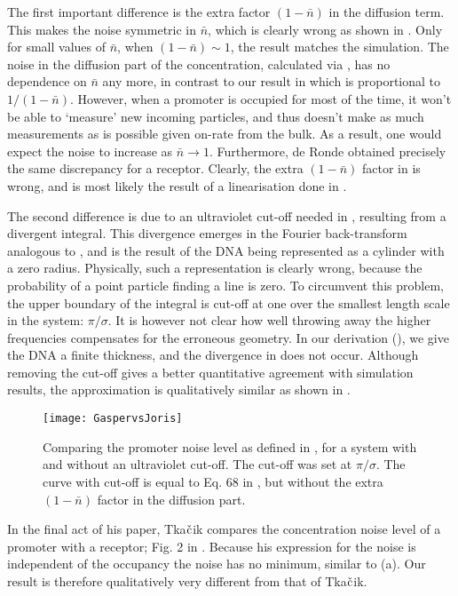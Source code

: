 The first important difference is the extra factor $(1-\bar{n})$ in the diffusion term. This makes the noise symmetric in $\bar{n}$, which is clearly wrong as shown in . Only for small values of $\bar{n}$, when $(1-\bar{n})\sim 1$, the result matches the simulation. The noise in the diffusion part of the concentration, calculated via , has no dependence on $\bar{n}$ any more, in contrast to our result in  which is proportional to $1/(1-\bar{n})$. However, when a promoter is occupied for most of the time, it won't be able to `measure' new incoming particles, and thus doesn't make as much measurements as is possible given on-rate from the bulk. As a result, one would expect the noise to increase as $\bar{n}\to1$. Furthermore, de Ronde \cite{DeRonde2012} obtained precisely the same discrepancy for a receptor. Clearly, the extra $(1-\bar{n})$ factor in  is wrong, and is most likely the result of a linearisation done in \cite{Tkacik2009}. 

The second difference is due to an ultraviolet cut-off needed in \cite{Tkacik2009}, resulting from a divergent integral. This divergence emerges in the Fourier back-transform analogous to , and is the result of the DNA being represented as a cylinder with a zero radius. Physically, such a representation is clearly wrong, because the probability of a point particle finding a line is zero. To circumvent this problem, the upper boundary of the integral is cut-off at one over the smallest length scale in the system: $\pi/\sigma$. It is however not clear how well throwing away the higher frequencies compensates for the erroneous geometry. In our derivation (), we give the DNA a finite thickness, and the divergence in  does not occur. Although removing the cut-off gives a better quantitative agreement with simulation results, the approximation is qualitatively similar as shown in .
\begin{figure}
\centering
\texttt{[image: GaspervsJoris]}
\caption{ Comparing the promoter noise level as defined in , for a system with and without an ultraviolet cut-off. The cut-off was set at $\pi/\sigma$. The curve with cut-off is equal to Eq. 68 in \cite{Tkacik2009}, but without the extra $(1-\bar{n})$ factor in the diffusion part.}
\end{figure}

In the final act of his paper, Tka$\check{\rm c}$ik compares the concentration noise level of a promoter with a receptor; Fig. 2 in \cite{Tkacik2009}. Because his expression for the noise is independent of the occupancy the noise has no minimum, similar to  (a). Our result is therefore qualitatively very different from that of Tka$\check{\rm c}$ik.



